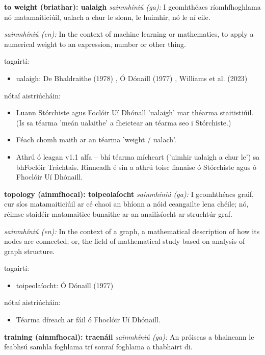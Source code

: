 \documentclass{article}
\begin{document}
\textbf{to weight (briathar): ualaigh}
\textit{sainmhíniú (ga):} I gcomhthéacs ríomhfhoghlama nó matamaiticiúil, ualach a chur le slonn, le huimhir, nó le ní eile.

\textit{sainmhíniú (en):} In the context of machine learning or mathematics, to apply a numerical weight to an expression, number or other thing.

tagairtí:
\begin{itemize}
	\item ualaigh: De Bhaldraithe (1978) \cite{de-bhaldraithe}, Ó Dónaill (1977) \cite{odonaill}, Williams et al. (2023) \cite{storchiste}
\end{itemize}

nótaí aistriúcháin:
\begin{itemize}
	\item Luann Stórchiste agus Foclóir Uí Dhónall 'ualaigh' mar théarma staitistiúil. (Is sa téarma 'meán ualaithe' a fheictear an téarma seo i Stórchiste.)
	\item Féach chomh maith ar an téarma 'weight / ualach'.
	\item Athrú ó leagan v1.1 alfa -- bhí téarma mícheart ('uimhir ualaigh a chur le') sa bhFoclóir Tráchtais. Rinneadh é sin a athrú toisc fianaise ó Stórchiste agus ó Fhoclóir Uí Dhónaill.
\end{itemize}


\textbf{topology (ainmfhocal): toipeolaíocht}
\textit{sainmhíniú (ga):} I gcomhthéacs graif, cur síos matamaiticiúil ar cé chaoi an bhíonn a nóid ceangailte lena chéile; nó, réimse staidéir matamaitice bunaithe ar an anailísíocht ar struchtúr graf.

\textit{sainmhíniú (en):} In the context of a graph, a mathematical description of how its nodes are connected; or, the field of mathematical study based on analysis of graph structure.

tagairtí:
\begin{itemize}
	\item toipeolaíocht: Ó Dónaill (1977) \cite{odonaill}
\end{itemize}

nótaí aistriúcháin:
\begin{itemize}
	\item Téarma díreach ar fáil ó Fhoclóir Uí Dhónaill.
\end{itemize}


\textbf{training (ainmfhocal): traenáil}
\textit{sainmhíniú (ga):} An próiseas a bhaineann le feabhsú samhla foghlama trí sonraí foghlama a thabhairt di.
\end{document}
